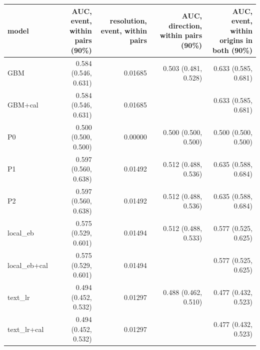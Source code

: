 \begin{tabular}{lrrrr}
\toprule
model & AUC, event, within pairs (90\%) & resolution, event, within pairs & AUC, direction, within pairs (90\%) & AUC, event, within origins in both (90\%) \\
\midrule
GBM & 0.584 (0.546, 0.631) & 0.01685 & 0.503 (0.481, 0.528) & 0.633 (0.585, 0.681) \\
GBM+cal & 0.584 (0.546, 0.631) & 0.01685 &  & 0.633 (0.585, 0.681) \\
P0 & 0.500 (0.500, 0.500) & 0.00000 & 0.500 (0.500, 0.500) & 0.500 (0.500, 0.500) \\
P1 & 0.597 (0.560, 0.638) & 0.01492 & 0.512 (0.488, 0.536) & 0.635 (0.588, 0.684) \\
P2 & 0.597 (0.560, 0.638) & 0.01492 & 0.512 (0.488, 0.536) & 0.635 (0.588, 0.684) \\
local\_eb & 0.575 (0.529, 0.601) & 0.01494 & 0.512 (0.488, 0.533) & 0.577 (0.525, 0.625) \\
local\_eb+cal & 0.575 (0.529, 0.601) & 0.01494 &  & 0.577 (0.525, 0.625) \\
text\_lr & 0.494 (0.452, 0.532) & 0.01297 & 0.488 (0.462, 0.510) & 0.477 (0.432, 0.523) \\
text\_lr+cal & 0.494 (0.452, 0.532) & 0.01297 &  & 0.477 (0.432, 0.523) \\
\bottomrule
\end{tabular}
